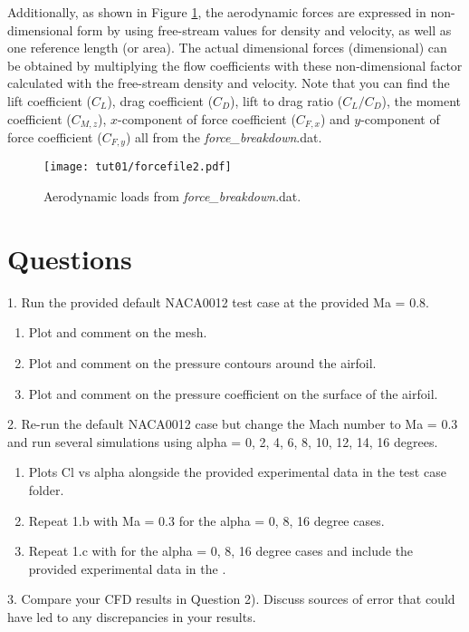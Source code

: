 Additionally, as shown in Figure \ref{fig1:forcefile2}, the aerodynamic forces are expressed in non-dimensional form by using free-stream values for density and velocity, as well as one reference length (or area). The actual dimensional forces (dimensional) can be obtained by multiplying the flow coefficients with these non-dimensional factor calculated with the free-stream density and velocity. Note that you can find the lift coefficient ($C_L$), drag coefficient ($C_D$), lift to drag ratio ($C_L / C_D$), the moment coefficient ($C_{M,z}$), $x$-component of force coefficient ($C_{F,x}$) and $y$-component of force coefficient ($C_{F,y}$) all from the \textit{force\_breakdown}.dat.
\begin{figure}[htbp]
    \centering
    \texttt{[image: tut01/forcefile2.pdf]}
    \caption{Aerodynamic loads from \textit{force\_breakdown}.dat.}
    \label{fig1:forcefile2}
\end{figure}
\clearpage
\section{Questions}
1. Run the provided default NACA0012 test case at the provided Ma = 0.8.
\begin{enumerate}[label=(\alph*)]
    \item Plot and comment on the mesh.
    \item Plot and comment on the pressure contours around the airfoil.
    \item Plot and comment on the pressure coefficient on the surface of the airfoil.
\end{enumerate}
2. Re-run the default NACA0012 case but change the Mach number to Ma = 0.3 and run several simulations using alpha = 0, 2, 4, 6, 8, 10, 12, 14, 16 degrees.
\begin{enumerate}[label=(\alph*)]
    \item Plots Cl vs alpha alongside the provided experimental data \cite{ladson1988effects} in the test case folder.
    \item Repeat 1.b with Ma = 0.3 for the alpha = 0, 8, 16 degree cases.
    \item Repeat 1.c with for the alpha = 0, 8, 16 degree cases and include the provided experimental data  in the \cite{ladson1987pressure}.
\end{enumerate}
3. Compare your CFD results in Question 2). Discuss sources of error that could have led to any discrepancies in your results.
